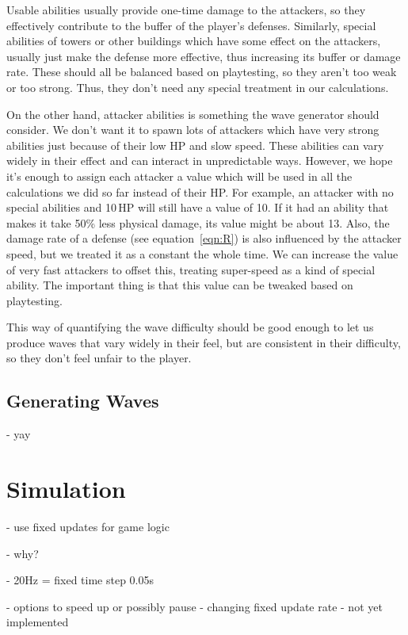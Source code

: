 Usable abilities usually provide one-time damage to the attackers, so they effectively contribute to the buffer of the player's defenses.
Similarly, special abilities of towers or other buildings which have some effect on the attackers, usually just make the defense more effective, thus increasing its buffer or damage rate.
These should all be balanced based on playtesting, so they aren't too weak or too strong.
Thus, they don't need any special treatment in our calculations.

On the other hand, attacker abilities is something the wave generator should consider.
We don't want it to spawn lots of attackers which have very strong abilities just because of their low HP and slow speed.
These abilities can vary widely in their effect and can interact in unpredictable ways.
However, we hope it's enough to assign each attacker a value which will be used in all the calculations we did so far instead of their HP.
For example, an attacker with no special abilities and 10\,HP will still have a value of 10.
If it had an ability that makes it take 50\% less physical damage, its value might be about 13.
Also, the damage rate of a defense (see equation~\ref{eqn:R}) is also influenced by the attacker speed, but we treated it as a constant the whole time.
We can increase the value of very fast attackers to offset this, treating super-speed as a kind of special ability.
The important thing is that this value can be tweaked based on playtesting.

This way of quantifying the wave difficulty should be good enough to let us produce waves that vary widely in their feel, but are consistent in their difficulty, so they don't feel unfair to the player.

\subsection{Generating Waves}

- yay

\section{Simulation}

- use fixed updates for game logic

- why?

- 20Hz = fixed time step 0.05s

- options to speed up or possibly pause - changing fixed update rate - not yet implemented

